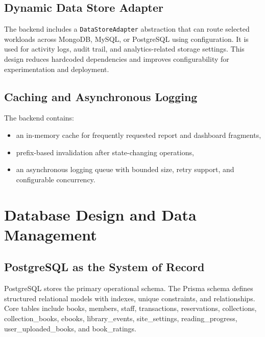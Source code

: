 \documentclass[12pt,a4paper]{report}
\begin{document}
\section{Dynamic Data Store Adapter}
The backend includes a \texttt{DataStoreAdapter} abstraction that can route selected workloads across MongoDB, MySQL, or PostgreSQL using configuration. It is used for activity logs, audit trail, and analytics-related storage settings. This design reduces hardcoded dependencies and improves configurability for experimentation and deployment.

\section{Caching and Asynchronous Logging}
The backend contains:
\begin{itemize}[leftmargin=1.5em]
    \item an in-memory cache for frequently requested report and dashboard fragments,
    \item prefix-based invalidation after state-changing operations,
    \item an asynchronous logging queue with bounded size, retry support, and configurable concurrency.
\end{itemize}

\chapter{Database Design and Data Management}
\section{PostgreSQL as the System of Record}
PostgreSQL stores the primary operational schema. The Prisma schema defines structured relational models with indexes, unique constraints, and relationships. Core tables include books, members, staff, transactions, reservations, collections, collection\_books, ebooks, library\_events, site\_settings, reading\_progress, user\_uploaded\_books, and book\_ratings.
\end{document}
